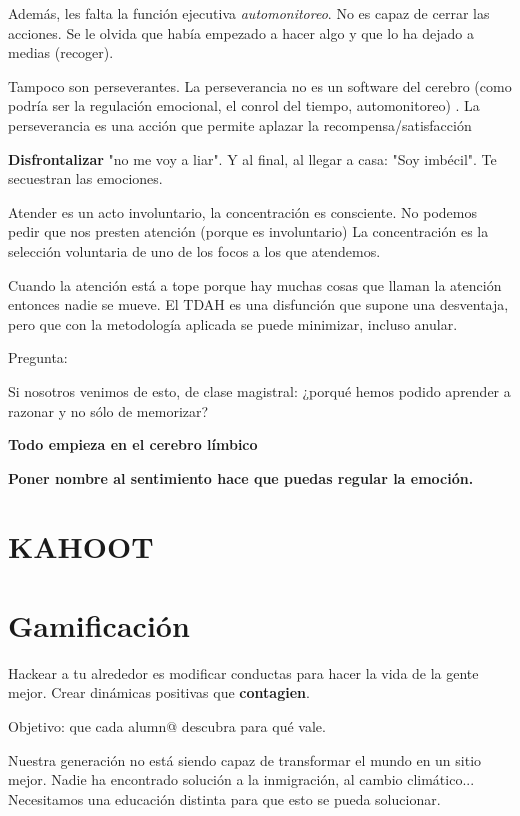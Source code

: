 \documentclass[palatino]{apuntes}
\begin{document}
Además, les falta la función ejecutiva \textit{automonitoreo}. No es capaz de cerrar las acciones. Se le olvida que había empezado a hacer algo y que lo ha dejado a medias (recoger).

Tampoco son perseverantes. La perseverancia no es un software del cerebro (como podría ser la regulación emocional, el conrol del tiempo, automonitoreo) .
%
La perseverancia es una acción que permite aplazar la recompensa/satisfacción

\textbf{Disfrontalizar} "no me voy a liar". Y al final, al llegar a casa: "Soy imbécil". Te secuestran las emociones.

Atender es un acto involuntario, la concentración es consciente. 
%
No podemos pedir que nos presten atención (porque es involuntario)
%
La concentración es la selección voluntaria de uno de los focos a los que atendemos.


Cuando la atención está a tope porque hay muchas cosas que llaman la atención entonces nadie se mueve. 
%
El TDAH es una disfunción que supone una desventaja, pero que con la metodología aplicada se puede minimizar, incluso anular.



Pregunta: 

Si nosotros venimos de esto, de clase magistral: ¿porqué hemos podido aprender a razonar y no sólo de memorizar? 



\textbf{Todo empieza en el cerebro límbico}

\textbf{Poner nombre al sentimiento hace que puedas regular la emoción.}

\section{KAHOOT}

\section{Gamificación}

\begin{defn}
Hackear a tu alrededor es modificar conductas para hacer la vida de la gente mejor. 
%
Crear dinámicas positivas que \textbf{contagien}.
\end{defn}

Objetivo: que cada alumn@ descubra para qué vale.

Nuestra generación no está siendo capaz de transformar el mundo en un sitio mejor. Nadie ha encontrado solución a la inmigración, al cambio climático... Necesitamos una educación distinta para que esto se pueda solucionar.
\end{document}
